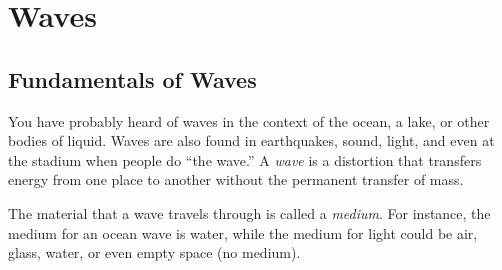 \chapter{Waves}
	\section{Fundamentals of Waves} 

	You have probably heard of waves in the context of the ocean, a lake, or other bodies of liquid.  Waves are also found in earthquakes, sound, light, and even at the stadium when people do ``the wave.''  A \textit{wave} is a distortion that transfers energy from one place to another without the permanent transfer of mass. 
	
	The material that a wave travels through is called a \textit{medium}.   For instance, the medium for an ocean wave is water, while the medium for light could be air, glass, water, or even empty space (no medium).  
	\newpage
